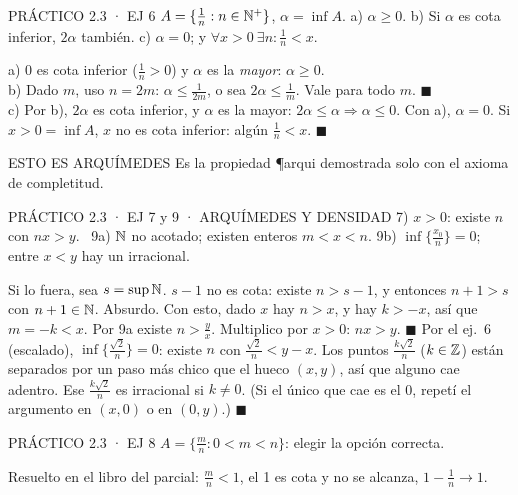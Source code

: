 \begin{enunciado}{PRÁCTICO 2.3 · EJ 6}
$A=\{\frac1n:n\in\mathbb{N}^+\}$, $\alpha=\inf A$. a) $\alpha\ge0$. b) Si $\alpha$ es cota inferior, $2\alpha$ también. c) $\alpha=0$; y $\forall x>0\ \exists n:\frac1n<x$.
\end{enunciado}
a) 0 es cota inferior ($\frac1n>0$) y $\alpha$ es la \emph{mayor}: $\alpha\ge0$.\\
b) Dado $m$, uso $n=2m$: $\alpha\le\frac1{2m}$, o sea $2\alpha\le\frac1m$. Vale para todo $m$. $\blacksquare$\\
c) Por b), $2\alpha$ es cota inferior, y $\alpha$ es la mayor: $2\alpha\le\alpha\Rightarrow\alpha\le0$. Con a), $\alpha=0$. Si $x>0=\inf A$, $x$ no es cota inferior: algún $\frac1n<x$. $\blacksquare$
\begin{tip}{ESTO ES ARQUÍMEDES}
Es la propiedad \P{arqui} demostrada solo con el axioma de completitud.
\end{tip}

\begin{enunciado}{PRÁCTICO 2.3 · EJ 7 y 9 · ARQUÍMEDES Y DENSIDAD}
7) $x>0$: existe $n$ con $nx>y$. \ 9a) $\mathbb{N}$ no acotado; existen enteros $m<x<n$. 9b) $\inf\{\frac{x_0}n\}=0$; entre $x<y$ hay un irracional.
\end{enunciado}
Si lo fuera, sea $s=\sup\mathbb{N}$. $s-1$ no es cota: existe $n>s-1$, y entonces $n+1>s$ con $n+1\in\mathbb{N}$. Absurdo. Con esto, dado $x$ hay $n>x$, y hay $k>-x$, así que $m=-k<x$.
Por 9a existe $n>\frac yx$. Multiplico por $x>0$: $nx>y$. $\blacksquare$
Por el ej.\ 6 (escalado), $\inf\{\frac{\sqrt2}n\}=0$: existe $n$ con $\frac{\sqrt2}n<y-x$. Los puntos $\frac{k\sqrt2}n$ ($k\in\mathbb{Z}$) están separados por un paso más chico que el hueco $(x,y)$, así que alguno cae adentro. Ese $\frac{k\sqrt2}n$ es irracional si $k\neq0$. (Si el único que cae es el 0, repetí el argumento en $(x,0)$ o en $(0,y)$.) $\blacksquare$

\begin{enunciado}{PRÁCTICO 2.3 · EJ 8}
$A=\{\frac mn:0<m<n\}$: elegir la opción correcta.
\end{enunciado}
Resuelto en el libro del parcial: $\frac mn<1$, el 1 es cota y no se alcanza, $1-\frac1n\to1$.

